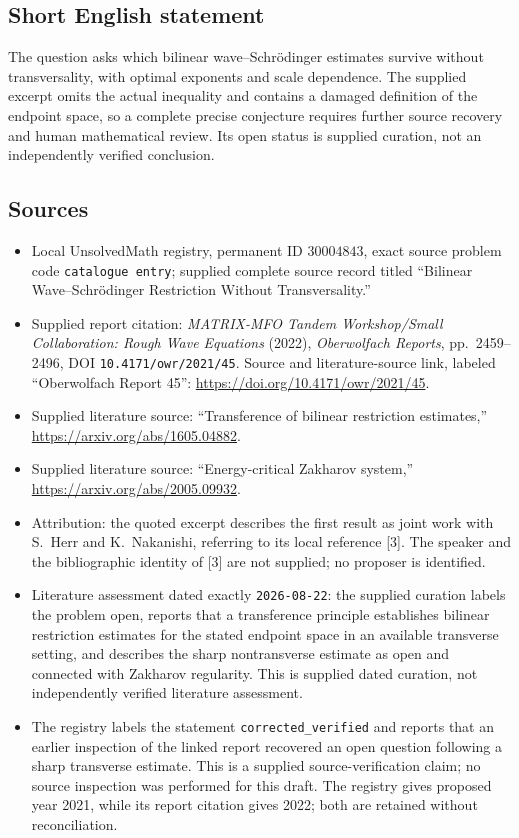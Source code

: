 \documentclass[11pt]{article}
\begin{document}
\subsection{Short English statement}
The question asks which bilinear wave--Schr\"odinger estimates survive without transversality, with optimal exponents and scale dependence. The supplied excerpt omits the actual inequality and contains a damaged definition of the endpoint space, so a complete precise conjecture requires further source recovery and human mathematical review. Its open status is supplied curation, not an independently verified conclusion.
\subsection{Sources}
\begin{itemize}
\item Local UnsolvedMath registry, permanent ID \(30004843\), exact source problem code \texttt{catalogue entry}; supplied complete source record titled ``Bilinear Wave--Schr\"odinger Restriction Without Transversality.''
\item Supplied report citation: \emph{MATRIX-MFO Tandem Workshop/Small Collaboration: Rough Wave Equations} (2022), \emph{Oberwolfach Reports}, pp.~2459--2496, DOI \texttt{10.4171/owr/2021/45}. Source and literature-source link, labeled ``Oberwolfach Report 45'': \url{https://doi.org/10.4171/owr/2021/45}.
\item Supplied literature source: ``Transference of bilinear restriction estimates,'' \url{https://arxiv.org/abs/1605.04882}.
\item Supplied literature source: ``Energy-critical Zakharov system,'' \url{https://arxiv.org/abs/2005.09932}.
\item Attribution: the quoted excerpt describes the first result as joint work with S.~Herr and K.~Nakanishi, referring to its local reference [3]. The speaker and the bibliographic identity of [3] are not supplied; no proposer is identified.
\item Literature assessment dated exactly \texttt{2026-08-22}: the supplied curation labels the problem open, reports that a transference principle establishes bilinear restriction estimates for the stated endpoint space in an available transverse setting, and describes the sharp nontransverse estimate as open and connected with Zakharov regularity. This is supplied dated curation, not independently verified literature assessment.
\item The registry labels the statement \texttt{corrected\_verified} and reports that an earlier inspection of the linked report recovered an open question following a sharp transverse estimate. This is a supplied source-verification claim; no source inspection was performed for this draft. The registry gives proposed year 2021, while its report citation gives 2022; both are retained without reconciliation.
\end{itemize}
\end{document}
